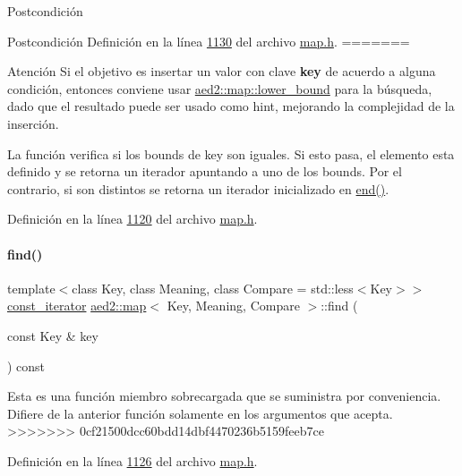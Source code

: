 \begin{DoxyPostcond}{\-Postcondición}
\begin{DoxyPostcond}{\-Postcondición}
\-Definición en la línea \hyperlink{map_8h_source_l01130}{1130} del archivo \hyperlink{map_8h_source}{map.\-h}.
=======
\begin{DoxyAttention}{Atención}
Si el objetivo es insertar un valor con clave {\bfseries key} de acuerdo a alguna condición, entonces conviene usar \hyperlink{classaed2_1_1map_a62075a47afdf89267c5462f88164af3d_a62075a47afdf89267c5462f88164af3d}{aed2\+::map\+::lower\+\_\+bound} para la búsqueda, dado que el resultado puede ser usado como hint, mejorando la complejidad de la inserción.
\end{DoxyAttention}
La función verifica si los bounds de key son iguales. Si esto pasa, el elemento esta definido y se retorna un iterador apuntando a uno de los bounds. Por el contrario, si son distintos se retorna un iterador inicializado en \hyperlink{classaed2_1_1map_a76023e6a56cb625513e1b5ea028bf983_a76023e6a56cb625513e1b5ea028bf983}{end()}. 

Definición en la línea \hyperlink{map_8h_source_l01120}{1120} del archivo \hyperlink{map_8h_source}{map.\+h}.

\mbox{\label{classaed2_1_1map_adbf6f4ce01a16ca506e3c75fc2843882_adbf6f4ce01a16ca506e3c75fc2843882}} 
\paragraph{\texorpdfstring{find()}{find()}\hspace{0.1cm}{\footnotesize\ttfamily [2/2]}}
{\footnotesize\ttfamily template$<$class Key, class Meaning, class Compare = std\+::less$<$\+Key$>$$>$ \\
\hyperlink{classaed2_1_1map_1_1const__iterator}{const\+\_\+iterator} \hyperlink{classaed2_1_1map}{aed2\+::map}$<$ Key, Meaning, Compare $>$\+::find (\begin{DoxyParamCaption}\item[{const Key \&}]{key }\end{DoxyParamCaption}) const\hspace{0.3cm}{\ttfamily [inline]}}

Esta es una función miembro sobrecargada que se suministra por conveniencia. Difiere de la anterior función solamente en los argumentos que acepta. 
>>>>>>> 0cf21500dcc60bdd14dbf4470236b5159feeb7ce

Definición en la línea \hyperlink{map_8h_source_l01126}{1126} del archivo \hyperlink{map_8h_source}{map.\+h}.


\end{DoxyPostcond}
\end{DoxyPostcond}
